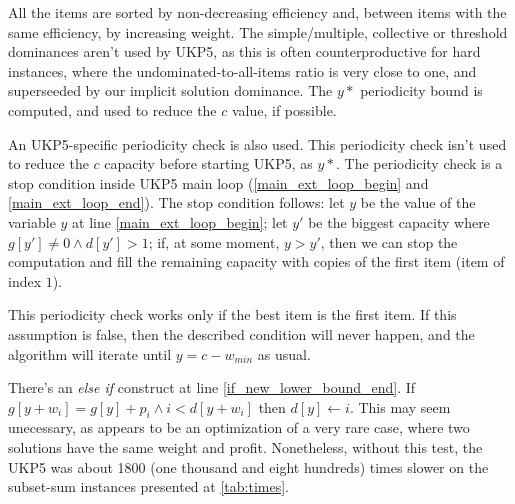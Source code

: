 \documentclass[runningheads,a4paper]{llncs}
\begin{document}
All the items are sorted by non-decreasing efficiency and, between items with the same efficiency, by increasing weight. The simple/multiple, collective or threshold dominances aren't used by UKP5, as this is often counterproductive for hard instances, where the undominated-to-all-items ratio is very close to one, and superseeded by our implicit solution dominance. The \(y*\) periodicity bound is computed\cite[p. 223]{CGAR}, and used to reduce the \(c\) value, if possible.

An UKP5-specific periodicity check is also used. This periodicity check isn't used to reduce the \(c\) capacity before starting UKP5, as \(y*\). The periodicity check is a stop condition inside UKP5 main loop (\ref{main_ext_loop_begin} and \ref{main_ext_loop_end}). The stop condition follows: let \(y\) be the value of the variable \(y\) at line \ref{main_ext_loop_begin}; let \(y'\) be the biggest capacity where \(g[y'] \neq 0 \land d[y'] > 1\); if, at some moment, \(y > y'\), then we can stop the computation and fill the remaining capacity with copies of the first item (item of index \(1\)).%


This periodicity check works only if the best item is the first item. If this assumption is false, then the described condition will never happen, and the algorithm will iterate until \(y = c - w_{min}\) as usual.

There's an \emph{else if} construct at line \ref{if_new_lower_bound_end}. If \(g[y + w_i] = g[y] + p_i \land i < d[y + w_i]\) then \(d[y] \gets i\). This may seem unecessary, as appears to be an optimization of a very rare case, where two solutions have the same weight and profit. Nonetheless, without this test, the UKP5 was about 1800 (one thousand and eight hundreds) times slower on the subset-sum instances presented at \ref{tab:times}.
\end{document}
